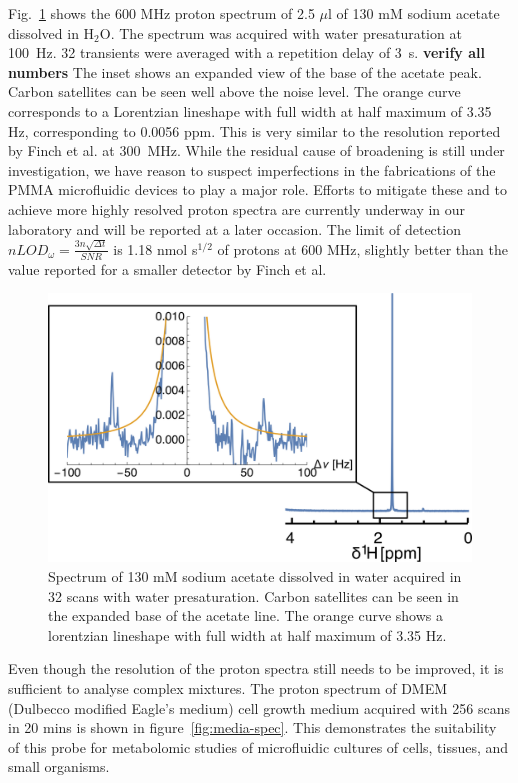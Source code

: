 \documentclass[preprint,12pt]{article}
\newcommand{\todo}[1]{{\color{red}\textbf{#1}}}
\newcommand{\fig}[1]{Fig.~\ref{#1}}
\begin{document}
\fig{fig:lineshape} shows the 600 MHz proton spectrum of 2.5 $\mu$l of 130 mM  sodium acetate dissolved in H$_2$O. 
The spectrum was acquired with water presaturation at 100~Hz. 32 transients were averaged with a repetition delay
of 3~s. \todo{verify all numbers} 
The inset shows an expanded view of the base of the acetate peak. Carbon satellites can be seen well above 
the noise level. The orange curve corresponds to a Lorentzian lineshape with full width at half maximum of 
3.35 Hz, corresponding to 0.0056 ppm. This is very similar to the resolution reported by Finch et al. at 300~MHz.
While the residual cause of broadening is still under investigation, we have reason to suspect imperfections
in the fabrications of the PMMA microfluidic devices to play a major role. Efforts to mitigate these and to
achieve more highly resolved proton spectra are currently underway in our laboratory and will be reported at a later
occasion.  The limit of detection $nLOD_{\omega}=\frac{3n\sqrt{{\Delta}t}}{SNR}$ is 
1.18 nmol s$^{1/2}$ of protons at 600 MHz, slightly better than the value reported for a 
smaller detector by Finch et al.~\cite{gream_2016}

\begin{figure}
\centering
\includegraphics[width=.7\linewidth,keepaspectratio=true]{./figures/lineshape.png} 
\caption{Spectrum of 130 mM sodium acetate dissolved in water acquired in 32 scans with water presaturation. Carbon satellites can be seen in the expanded base of the acetate line. The orange curve shows a lorentzian lineshape with full width at half maximum of 3.35 Hz.}
\label{fig:lineshape} 
\end{figure}

Even though the resolution of the proton spectra still needs to be improved, it is sufficient to analyse
complex mixtures. The proton spectrum of DMEM (Dulbecco modified Eagle's medium) cell growth medium acquired with 256 
scans in 20 mins is shown in figure~\ref{fig:media-spec}. This demonstrates the suitability of this probe 
for metabolomic studies of microfluidic cultures of cells, tissues, and small organisms. 
\end{document}
